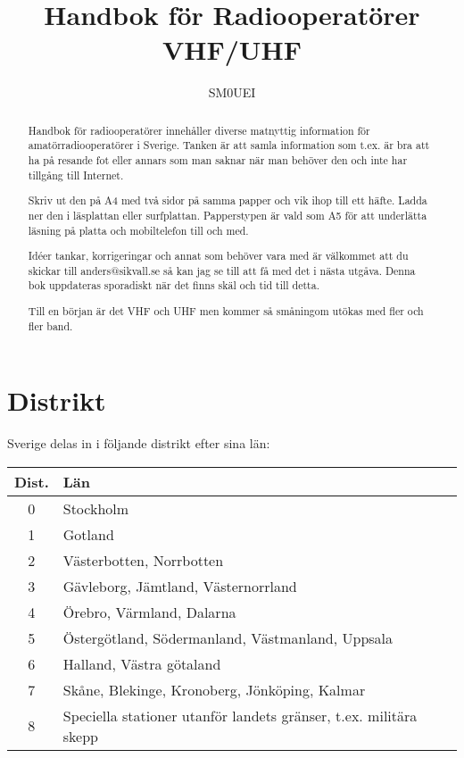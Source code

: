 \documentclass[12pt,swedish,a4paper]{article}
\begin{document}
\title{Handbok för Radiooperatörer\\
VHF/UHF}
\author{SM0UEI}
\maketitle

\begin{abstract}
Handbok för radiooperatörer innehåller diverse matnyttig information för amatörradiooperatörer i Sverige. Tanken är att samla information som t.ex. är bra att ha på resande fot eller annars som man saknar när man behöver den och inte har tillgång till Internet.

Skriv ut den på A4 med två sidor på samma papper och vik ihop till ett häfte. Ladda ner den i läsplattan eller surfplattan. Papperstypen är vald som A5 för att underlätta läsning på platta och mobiltelefon till och med.

Idéer tankar, korrigeringar och annat som behöver vara med är välkommet att du skickar till anders@sikvall.se så kan jag se till att få med det i nästa utgåva. Denna bok uppdateras sporadiskt när det finns skäl och tid till detta.

Till en början är det VHF och UHF men kommer så småningom utökas med fler och fler band.
\end{abstract}

\clearpage
\tableofcontents
\clearpage

\setlength{\parskip}{0.5em}
\setlength{\parindent}{0pt}


\section{Distrikt}

Sverige delas in i följande distrikt efter sina län:

\begin{tabular}{cl}
\textbf{Dist.} & \textbf{Län}\\
\hline
0 & Stockholm\\
1 & Gotland\\
2 & Västerbotten, Norrbotten\\
3 & Gävleborg, Jämtland, Västernorrland\\
4 & Örebro, Värmland, Dalarna\\
5 & Östergötland, Södermanland, Västmanland, Uppsala\\
6 & Halland, Västra götaland\\
7 & Skåne, Blekinge, Kronoberg, Jönköping, Kalmar\\
8 & Speciella stationer utanför landets gränser, t.ex. militära skepp\\
\end{tabular}
\end{document}
